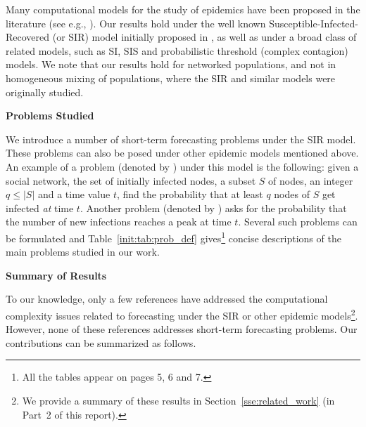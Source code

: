 Many computational models for the study of
epidemics have been proposed in the literature (see e.g., 
\cite{Brauer-2008,marathe:cacm13,Britton-2009,kermack+m:SIR,epi-Bailey,
epi-Hethcote}).
Our results hold under the well known
Susceptible-Infected-Recovered (or SIR) model 
initially proposed in \cite{kermack+m:SIR}, 
as well as under a broad class of 
related models, such as SI, SIS and probabilistic threshold 
(complex contagion) models. 
We note that our results hold for networked populations, and not
in homogeneous mixing of populations, where the SIR and similar
models were originally studied.

\bigskip


\noindent
{\Large\textbf{Problems Studied}}

\medskip
\noindent
We introduce a number of short-term forecasting
problems under the SIR model. 
These problems can also be posed under other epidemic
models mentioned above.
An example of a problem (denoted by \tNewInfs) under this model 
is the following: given
a social network, the set of initially infected nodes, a subset $S$
of nodes, an integer $q \leq |S|$ and a time value $t$, find the probability 
that at least $q$ nodes of $S$ get infected \emph{at} time $t$.
Another problem (denoted by \tPeak) asks for the probability that
the number of new infections reaches a peak at time $t$.
Several such problems can be formulated and
Table~\ref{init:tab:prob_def} gives\footnote{All the tables appear on
pages 5, 6 and 7.} concise descriptions of the main problems
studied in our work. 

\bigskip

\noindent
{\Large\textbf{Summary of Results}}

\medskip
\noindent
To our knowledge, only a few references \cite{LZ-2009,PS-2012,SD-2012}
have addressed the computational complexity issues related to forecasting 
under the SIR or other epidemic models\footnote{
We provide a summary of these results in Section~\ref{sse:related_work}
(in Part~2 of this report).}.
However, none of these references addresses short-term forecasting problems.
Our contributions can be summarized as follows.

